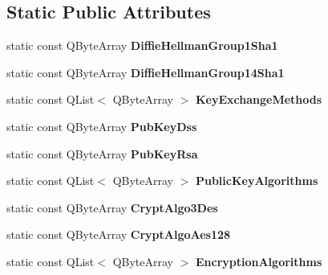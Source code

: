 \subsection*{Static Public Attributes}
\begin{DoxyCompactItemize}
\item 
\mbox{\label{class_q_ssh_1_1_internal_1_1_ssh_capabilities_a9506716ddc392a7c8d297361b81805a7}} 
static const Q\+Byte\+Array {\bfseries Diffie\+Hellman\+Group1\+Sha1}
\item 
\mbox{\label{class_q_ssh_1_1_internal_1_1_ssh_capabilities_a5bd9bdf86cc283ea9b3218f1e0ffe539}} 
static const Q\+Byte\+Array {\bfseries Diffie\+Hellman\+Group14\+Sha1}
\item 
static const Q\+List$<$ Q\+Byte\+Array $>$ {\bfseries Key\+Exchange\+Methods}
\item 
\mbox{\label{class_q_ssh_1_1_internal_1_1_ssh_capabilities_aa7c544f917d95877fdf5ac4ea524a6ac}} 
static const Q\+Byte\+Array {\bfseries Pub\+Key\+Dss}
\item 
\mbox{\label{class_q_ssh_1_1_internal_1_1_ssh_capabilities_a02adb52dd5f5f47611775f336fcb515b}} 
static const Q\+Byte\+Array {\bfseries Pub\+Key\+Rsa}
\item 
static const Q\+List$<$ Q\+Byte\+Array $>$ {\bfseries Public\+Key\+Algorithms}
\item 
\mbox{\label{class_q_ssh_1_1_internal_1_1_ssh_capabilities_ae2c38cca9c61c24294314dab959aa28d}} 
static const Q\+Byte\+Array {\bfseries Crypt\+Algo3\+Des}
\item 
\mbox{\label{class_q_ssh_1_1_internal_1_1_ssh_capabilities_a4c2a47c9d1b908ebca661eca7dd5c90f}} 
static const Q\+Byte\+Array {\bfseries Crypt\+Algo\+Aes128}
\item 
static const Q\+List$<$ Q\+Byte\+Array $>$ {\bfseries Encryption\+Algorithms}
\item 
\mbox{\label{class_q_ssh_1_1_internal_1_1_ssh_capabilities_a212353305b4764a4347fc4d32e93cac0}} 

\end{DoxyCompactItemize}

